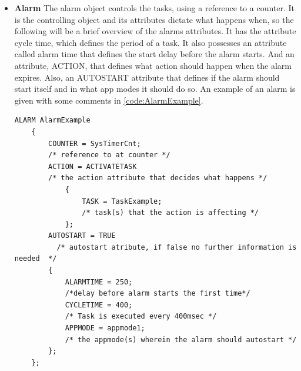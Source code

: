 \begin{itemize}
    \item{\textbf{Alarm}}
    The alarm object controls the tasks, using a reference to a counter. It is the controlling object and its attributes dictate what happens when, so the following will be a brief overview of the alarms attributes. It has the attribute cycle time, which defines the period of a task. It also possesses an attribute called alarm time that defines the start delay before the alarm starts. And an attribute, ACTION, that defines what action should happen when the alarm expires. Also, an AUTOSTART attribute that defines if the alarm should start itself and in what app modes it should do so.  An example of an alarm is given with some comments in \ref{code:AlarmExample}.
    
    \begin{lstlisting}[frame=single, label={code:AlarmExample}, caption={A example of an alarm in OIL}, xleftmargin=.00\textwidth, xrightmargin=.00\textwidth]
    ALARM AlarmExample
    {
        COUNTER = SysTimerCnt;
        /* reference to at counter */
        ACTION = ACTIVATETASK 
        /* the action attribute that decides what happens */
            {
                TASK = TaskExample;
                /* task(s) that the action is affecting */
            };
        AUTOSTART = TRUE
          /* autostart atribute, if false no further information is needed  */
        { 
            ALARMTIME = 250;
            /*delay before alarm starts the first time*/
            CYCLETIME = 400; 
            /* Task is executed every 400msec */
            APPMODE = appmode1;
            /* the appmode(s) wherein the alarm should autostart */
        };
    };
    \end{lstlisting}
\end{itemize}

